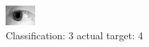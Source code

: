 \begin{figure}[h!]
\begin{center}
\includegraphics[width=0.60\columnwidth]{figures/ID1211_class_3_target_4.png}
\end{center}
\caption{ Classification: 3 actual target: 4}
\label{fig:ID1211_class_3_target_4}
\end{figure}
